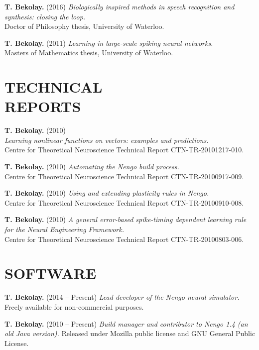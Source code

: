 \documentclass[line,margin]{res}
\begin{document}
\begin{resume}
\textbf{T. Bekolay.} (2016)
  {\sl Biologically inspired methods in speech recognition and synthesis:
  closing the loop.} \\
  Doctor of Philosophy thesis, University of Waterloo.

\textbf{T. Bekolay.} (2011)
  {\sl Learning in large-scale spiking neural networks.} \\
  Masters of Mathematics thesis, University of Waterloo.

\section{TECHNICAL \\REPORTS}

\textbf{T. Bekolay.} (2010) \\
  {\sl Learning nonlinear functions on vectors: examples and predictions.} \\
  Centre for Theoretical Neuroscience Technical Report CTN-TR-20101217-010.

\textbf{T. Bekolay.} (2010)
  {\sl Automating the Nengo build process.} \\
  Centre for Theoretical Neuroscience Technical Report CTN-TR-20100917-009.

\textbf{T. Bekolay.} (2010)
  {\sl Using and extending plasticity rules in Nengo.} \\
  Centre for Theoretical Neuroscience Technical Report CTN-TR-20100910-008.

\textbf{T. Bekolay.} (2010)
  {\sl A general error-based spike-timing dependent learning rule for
  the Neural Engineering Framework.} \\
  Centre for Theoretical Neuroscience Technical Report CTN-TR-20100803-006.



\section{SOFTWARE}

\textbf{T. Bekolay.} (2014 -- Present)
  {\sl Lead developer of the Nengo neural simulator.}
  Freely available for non-commercial purposes.

\textbf{T. Bekolay.} (2010 -- Present)
  {\sl Build manager and contributor to Nengo 1.4 (an old Java version).}
  Released under Mozilla public license and GNU General Public License.


\end{resume}
\end{document}
